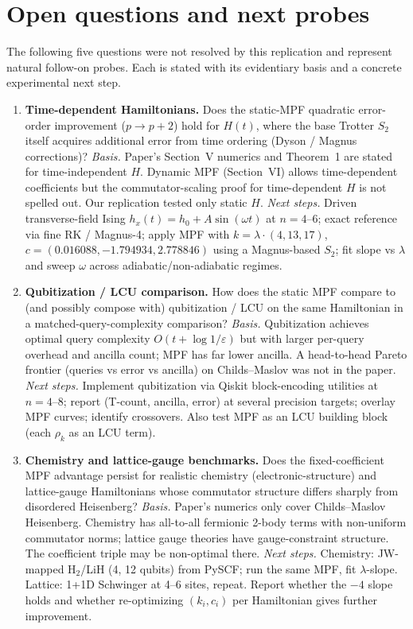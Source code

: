 \section{Open questions and next probes}

The following five questions were not resolved by this replication and represent natural follow-on
probes. Each is stated with its evidentiary basis and a concrete experimental next step.

\begin{enumerate}

\item \textbf{Time-dependent Hamiltonians.}
Does the static-MPF quadratic error-order improvement ($p \to p+2$) hold for $H(t)$, where the
base Trotter $S_2$ itself acquires additional error from time ordering (Dyson / Magnus corrections)?
\emph{Basis.} Paper's Section~V numerics and Theorem~1 are stated for time-independent $H$. Dynamic
MPF (Section~VI) allows time-dependent coefficients but the commutator-scaling proof for
time-dependent $H$ is not spelled out. Our replication tested only static $H$.
\emph{Next steps.} Driven transverse-field Ising $h_x(t) = h_0 + A\sin(\omega t)$ at $n=4\text{--}6$;
exact reference via fine RK / Magnus-4; apply MPF with $k = \lambda\cdot(4,13,17)$,
$c = (0.016088, -1.794934, 2.778846)$ using a Magnus-based $S_2$; fit slope vs $\lambda$ and
sweep $\omega$ across adiabatic/non-adiabatic regimes.

\item \textbf{Qubitization / LCU comparison.}
How does the static MPF compare to (and possibly compose with) qubitization / LCU on the same
Hamiltonian in a matched-query-complexity comparison?
\emph{Basis.} Qubitization achieves optimal query complexity $O(t + \log 1/\varepsilon)$ but with
larger per-query overhead and ancilla count; MPF has far lower ancilla. A head-to-head Pareto
frontier (queries vs error vs ancilla) on Childs--Maslov was not in the paper.
\emph{Next steps.} Implement qubitization via Qiskit block-encoding utilities at $n=4\text{--}8$;
report (T-count, ancilla, error) at several precision targets; overlay MPF curves; identify
crossovers. Also test MPF as an LCU building block (each $\rho_k$ as an LCU term).

\item \textbf{Chemistry and lattice-gauge benchmarks.}
Does the fixed-coefficient MPF advantage persist for realistic chemistry (electronic-structure) and
lattice-gauge Hamiltonians whose commutator structure differs sharply from disordered Heisenberg?
\emph{Basis.} Paper's numerics only cover Childs--Maslov Heisenberg. Chemistry has all-to-all
fermionic 2-body terms with non-uniform commutator norms; lattice gauge theories have
gauge-constraint structure. The coefficient triple may be non-optimal there.
\emph{Next steps.} Chemistry: JW-mapped H$_2$/LiH (4, 12 qubits) from PySCF; run the same MPF, fit
$\lambda$-slope. Lattice: 1+1D Schwinger at 4--6 sites, repeat. Report whether the $-4$ slope holds
and whether re-optimizing $(k_i, c_i)$ per Hamiltonian gives further improvement.


\end{enumerate}

